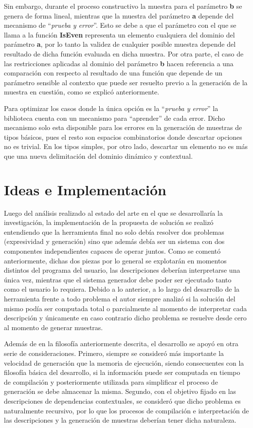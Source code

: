 Sin embargo, durante el proceso constructivo la muestra para el parámetro {\bf b} se genera de forma lineal, mientras que la
muestra del parámetro {\bf a} depende del mecanismo de “{\it prueba y error}”. Esto se debe a que el parámetro con el que se llama
a la función {\bf IsEven} representa un elemento cualquiera del dominio del parámetro {\bf a}, por lo tanto la validez de cualquier
posible muestra depende del resultado de dicha función evaluada en dicha muestra. Por otra parte, el caso de las
restricciones aplicadas al dominio del parámetro {\bf b} hacen referencia a una comparación con respecto al resultado de una
función que depende de un parámetro sensible al contexto que puede ser resuelto previo a la generación de la muestra en
cuestión, como se explicó anteriormente.

Para optimizar los casos donde la única opción es la “{\it prueba y error}” la biblioteca cuenta con un mecanismo para “aprender”
de cada error. Dicho mecanismo solo esta disponible para los errores en la generación de muestras de tipos básicos, pues el
resto son espacios combinatorios donde descartar opciones no es trivial. En los tipos simples, por otro lado, descartar un
elemento no es más que una nueva delimitación del dominio dinámico y contextual.

\section{Ideas e Implementación}


Luego del análisis realizado al estado del arte en el que se desarrollaría la investigación, la implementación de
la propuesta de solución se realizó entendiendo que la herramienta final no solo debía resolver dos problemas
(expresividad y generación) sino que además debía ser un sistema con dos componentes independientes capaces de
operar juntos. Como se comentó anteriormente, dichas dos piezas por lo general se explotarán en momentos distintos
del programa del usuario, las descripciones deberían interpretarse una única vez, mientras que el sistema generador
debe poder ser ejecutado tanto como el usuario lo requiera. Debido a lo anterior, a lo largo del desarrollo de la
herramienta frente a todo problema el autor siempre analizó si la solución del mismo podía ser computada total o
parcialmente al momento de interpretar cada descripción y únicamente en caso contrario dicho problema se resuelve desde
cero al momento de generar muestras.


Además de en la filosofía anteriormente descrita, el desarrollo se apoyó en otra serie de consideraciones.
Primero, siempre se consideró más importante la velocidad de generación que la memoria de ejecución, siendo 
consecuentes con la filosofía básica del desarrollo, si la información puede ser computada en tiempo de compilación y
posteriormente utilizada para simplificar el proceso de generación se debe almacenar la misma. Segundo, con el objetivo
fijado en las descripciones de dependencias contextuales, se consideró que dicho problema es naturalmente recursivo, por
lo que los procesos de compilación e interpretación de las descripciones y la generación de muestras deberían tener
dicha naturaleza.

